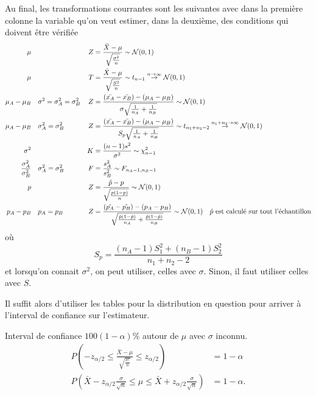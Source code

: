 Au final, les transformations courrantes sont les suivantes
avec dans la première colonne la variable qu'on veut estimer,
dans la deuxième, des conditions qui doivent être vérifiée
\begin{align*}
  \mu & & Z & = \frac{\bar{X} - \mu}{\sqrt{\frac{\sigma^2}{n}}} \sim \mathcal{N}(0, 1)\\
  \mu & & T & = \frac{\bar{X} - \mu}{\sqrt{\frac{S^2}{n}}} \sim t_{n-1} \stackrel{n \to \infty}{\to} \mathcal{N}(0,1)\\
  \mu_A - \mu_B & \quad \sigma^2 = \sigma_A^2 = \sigma_B^2 & Z & = \frac{(\bar{x_A} - \bar{x_B}) - (\mu_A - \mu_B)}{\sigma\sqrt{\frac{1}{n_A} + \frac{1}{n_B}}} \sim \mathcal{N}(0,1)\\
  \mu_A - \mu_B & \quad \sigma_A^2 = \sigma_B^2 & Z & = \frac{(\bar{x_A} - \bar{x_B}) - (\mu_A - \mu_B)}{S_p\sqrt{\frac{1}{n_A} + \frac{1}{n_B}}} \sim t_{n_1+n_2-2} \stackrel{n_1 + n_2 \to \infty}{\to} \mathcal{N}(0,1)\\
  \sigma^2 & & K & = \frac{(n-1)s^2}{\sigma^2} \sim \chi_{n-1}^2\\
  \frac{\sigma_A^2}{\sigma_B^2} & \quad \sigma_A^2 = \sigma_B^2 & F & = \frac{s_A^2}{s_B^2} \sim F_{n_A-1,n_B-1}\\
  p & & Z & = \frac{\hat{p} - p}{\sqrt{\frac{p(1-p)}{n}}} \sim \mathcal{N}(0, 1)\\
  p_A - p_B & \quad p_A = p_B & Z & = \frac{(\hat{p_A} - \hat{p_B}) - (p_A - p_B)}{\sqrt{\frac{\hat{p}(1-\hat{p})}{n_A} + \frac{\hat{p}(1-\hat{p})}{n_B}}}
  \sim \mathcal{N}(0, 1) \quad \hat{p}\text{ est calculé sur tout l'échantillon}
\end{align*}
où
\[ S_p = \frac{(n_A-1)S_1^2 + (n_B-1)S_2^2}{n_1+n_2-2} \]
et lorsqu'on connait $\sigma^2$, on peut utiliser, celles avec $\sigma$.
Sinon, il faut utiliser celles avec $S$.

Il suffit alors d'utiliser les tables pour la distribution en question pour arriver à l'interval de confiance sur
l'estimateur.

\begin{myexem}
  Interval de confiance $100(1-\alpha)\%$ autour de $\mu$ avec $\sigma$ inconnu.
  \begin{align*}
    P(-z_{\alpha/2} \leq \frac{\bar{X}-\mu}{\sqrt{\frac{\sigma^2}{n}}} \leq z_{\alpha/2}) & = 1 - \alpha\\
    P(\bar{X}-z_{\alpha/2}\frac{\sigma}{\sqrt{n}} \leq \mu \leq \bar{X}+z_{\alpha/2}\frac{\sigma}{\sqrt{n}}) & = 1 - \alpha.
  \end{align*}
\end{myexem}

